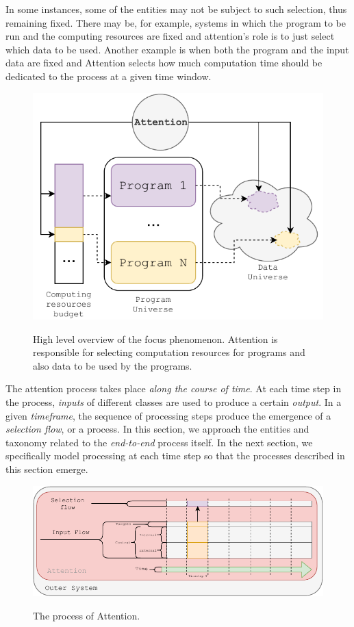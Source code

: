 \documentclass[11pt]{article}
\begin{document}
In some instances, some of the entities may not be subject to such selection, thus remaining fixed.
There may be, for example, systems in which the program to be run and the computing resources are fixed and attention's role
is to just select which data to be used.
Another example is when both the program and the input data are fixed and Attention selects how much computation time
should be dedicated to the process at a given time window.

\begin{figure}[H]
    \centering
    \includegraphics[width=0.7\linewidth]{./img/mind.pdf}\label{fig:mind}
    \caption{High level overview of the focus phenomenon. Attention is responsible for selecting computation resources for programs and also data to be used by the programs.}
\end{figure}

The attention process takes place \emph{along the course of time}.
At each time step in the process, \emph{inputs} of different classes are used to produce a certain \emph{output}.
In a given \emph{timeframe}, the sequence of processing steps produce the emergence of a \emph{selection flow}, or a process.
In this section, we approach the entities and taxonomy related to the \emph{end-to-end} process itself.
In the next section, we specifically model processing at each time step so that the processes described in this section emerge.

\begin{figure}[H]
    \centering
    \includegraphics[width=1.0\linewidth]{./img/att_flow.pdf}\label{fig:attflow}
    \caption{The process of Attention.}
\end{figure}
\end{document}
